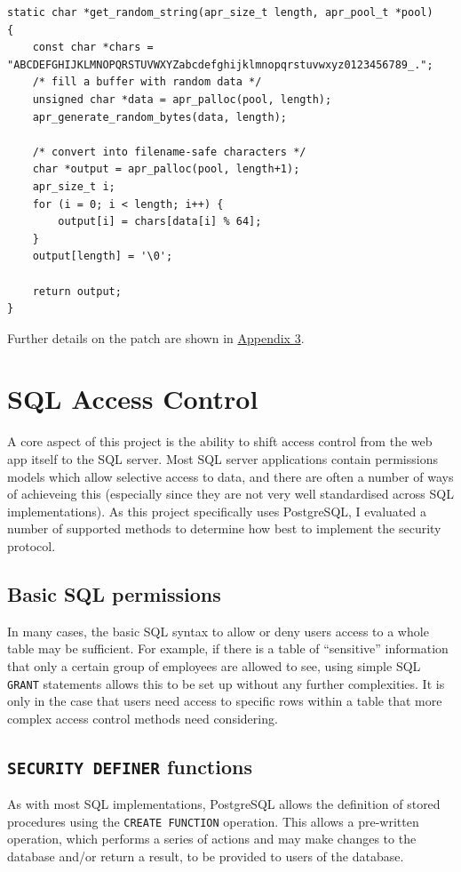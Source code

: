 \documentclass{report}
\begin{document}
\begin{verbatim}
static char *get_random_string(apr_size_t length, apr_pool_t *pool)
{
    const char *chars = "ABCDEFGHIJKLMNOPQRSTUVWXYZabcdefghijklmnopqrstuvwxyz0123456789_.";
    /* fill a buffer with random data */
    unsigned char *data = apr_palloc(pool, length);
    apr_generate_random_bytes(data, length);

    /* convert into filename-safe characters */
    char *output = apr_palloc(pool, length+1);
    apr_size_t i;
    for (i = 0; i < length; i++) {
        output[i] = chars[data[i] % 64];
    }
    output[length] = '\0';

    return output;
}
\end{verbatim}

Further details on the patch are shown in \hyperref[sec:appendix3]{Appendix 3}.


\section{SQL Access Control}
A core aspect of this project is the ability to shift access control from the web app itself to the SQL server. Most SQL server applications contain permissions models which allow selective access to data, and there are often a number of ways of achieveing this (especially since they are not very well standardised across SQL implementations). As this project specifically uses PostgreSQL, I evaluated a number of supported methods to determine how best to implement the security protocol.

\subsection{Basic SQL permissions}
In many cases, the basic SQL syntax to allow or deny users access to a whole table may be sufficient. For example, if there is a table of ``sensitive'' information that only a certain group of employees are allowed to see, using simple SQL \texttt{GRANT} statements allows this to be set up without any further complexities. It is only in the case that users need access to specific rows within a table that more complex access control methods need considering.

\subsection{\texttt{SECURITY DEFINER} functions}
As with most SQL implementations, PostgreSQL allows the definition of stored procedures using the \texttt{CREATE FUNCTION} operation. This allows a pre-written operation, which performs a series of actions and may make changes to the database and/or return a result, to be provided to users of the database.
\end{document}
